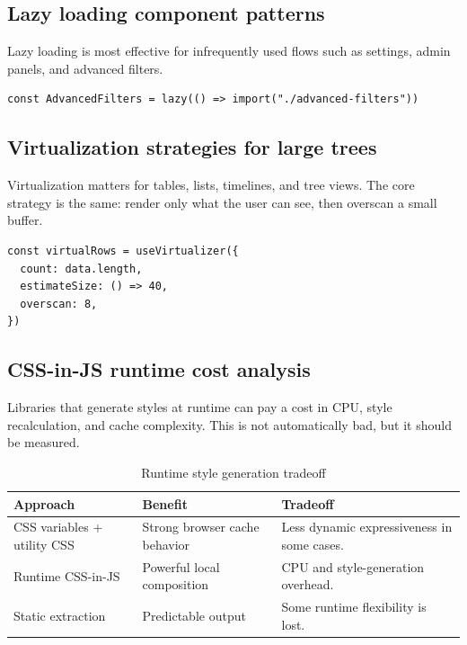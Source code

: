 \subsection{Lazy loading component patterns}
Lazy loading is most effective for infrequently used flows such as settings, admin panels, and advanced filters.

\begin{verbatim}
const AdvancedFilters = lazy(() => import("./advanced-filters"))
\end{verbatim}

\subsection{Virtualization strategies for large trees}
Virtualization matters for tables, lists, timelines, and tree views. The core strategy is the same: render only what the user can see, then overscan a small buffer.

\begin{verbatim}
const virtualRows = useVirtualizer({
  count: data.length,
  estimateSize: () => 40,
  overscan: 8,
})
\end{verbatim}

\subsection{CSS-in-JS runtime cost analysis}
Libraries that generate styles at runtime can pay a cost in CPU, style recalculation, and cache complexity. This is not automatically bad, but it should be measured.

\begin{table}[htbp]
  \centering
  \caption{Runtime style generation tradeoff}
  \begin{tabularx}{\textwidth}{@{}p{}p{}Y@{}}
    \toprule
    \textbf{Approach} & \textbf{Benefit} & \textbf{Tradeoff} \\
    \midrule
    CSS variables + utility CSS & Strong browser cache behavior & Less dynamic expressiveness in some cases. \\
    Runtime CSS-in-JS & Powerful local composition & CPU and style-generation overhead. \\
    Static extraction & Predictable output & Some runtime flexibility is lost. \\
    \bottomrule
  \end{tabularx}
\end{table}

